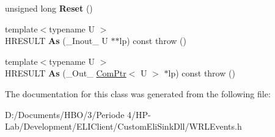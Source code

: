 \begin{DoxyCompactItemize}
unsigned long {\bfseries Reset} ()
\item 
\mbox{\label{class_com_ptr_ad5af7406f69e121a870e4802e1f158ae}} 
{\footnotesize template$<$typename U $>$ }\\H\+R\+E\+S\+U\+LT {\bfseries As} (\+\_\+\+Inout\+\_\+ U $\ast$$\ast$lp) const  throw ()
\item 
\mbox{\label{class_com_ptr_abe22e0e50d45e7a57a2c88d868299543}} 
{\footnotesize template$<$typename U $>$ }\\H\+R\+E\+S\+U\+LT {\bfseries As} (\+\_\+\+Out\+\_\+ \hyperlink{class_com_ptr}{Com\+Ptr}$<$ U $>$ $\ast$lp) const  throw ()
\end{DoxyCompactItemize}


The documentation for this class was generated from the following file\+:\begin{DoxyCompactItemize}
\item 
D\+:/\+Documents/\+H\+B\+O/3/\+Periode 4/\+H\+P-\/\+Lab/\+Development/\+E\+L\+I\+Client/\+Custom\+Eli\+Sink\+Dll/W\+R\+L\+Events.\+h\end{DoxyCompactItemize}
